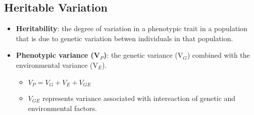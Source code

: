 \documentclass[12pt,a4paper]{article}
\begin{document}
\subsection{Heritable Variation}
\begin{itemize}
    \item \textbf{Heritability}: the degree of {\color{o-Sun}variation} in a phenotypic trait in a population that is due to genetic variation betwen individuals in that population.
    \item \textbf{Phenotypic variance (V\(_{P}\))}: the genetic variance (V\(_{G}\)) combined with the environmental variance (V\(_{E}\)).
        \begin{itemize}
            \item {\color{o-Sun}\(V_P = V_G + V_E + V_{GE}\)}
            \item \(V_{GE}\) represents variance associated with {\color{o-Sun}intereaction} of genetic and environmental factors. 
        \end{itemize}

\end{itemize}
\end{document}
